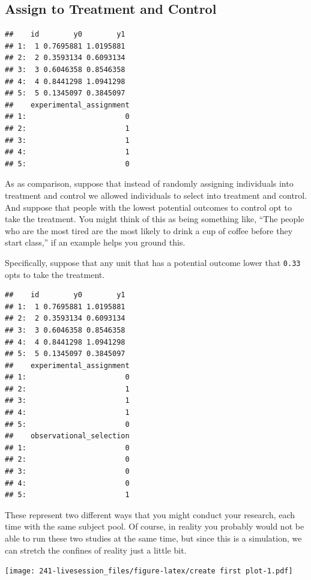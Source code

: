 \documentclass[
]{book}
\begin{document}
\hypertarget{assign-to-treatment-and-control}{%
\subsection{Assign to Treatment and
Control}\label{assign-to-treatment-and-control}}

\begin{verbatim}
##    id        y0        y1
## 1:  1 0.7695881 1.0195881
## 2:  2 0.3593134 0.6093134
## 3:  3 0.6046358 0.8546358
## 4:  4 0.8441298 1.0941298
## 5:  5 0.1345097 0.3845097
##    experimental_assignment
## 1:                       0
## 2:                       1
## 3:                       1
## 4:                       1
## 5:                       0
\end{verbatim}

As as comparison, suppose that instead of randomly assigning individuals
into treatment and control we allowed individuals to select into
treatment and control. And suppose that people with the lowest potential
outcomes to control opt to take the treatment. You might think of this
as being something like, ``The people who are the most tired are the
most likely to drink a cup of coffee before they start class,'' if an
example helps you ground this.

Specifically, suppose that any unit that has a potential outcome lower
that \texttt{0.33} opts to take the treatment.

\begin{verbatim}
##    id        y0        y1
## 1:  1 0.7695881 1.0195881
## 2:  2 0.3593134 0.6093134
## 3:  3 0.6046358 0.8546358
## 4:  4 0.8441298 1.0941298
## 5:  5 0.1345097 0.3845097
##    experimental_assignment
## 1:                       0
## 2:                       1
## 3:                       1
## 4:                       1
## 5:                       0
##    observational_selection
## 1:                       0
## 2:                       0
## 3:                       0
## 4:                       0
## 5:                       1
\end{verbatim}

These represent two different ways that you might conduct your research,
each time with the same subject pool. Of course, in reality you probably
would not be able to run these two studies at the same time, but since
this is a simulation, we can stretch the confines of reality just a
little bit.

\texttt{[image: 241-livesession\_files/figure-latex/create first plot-1.pdf]}
\end{document}
